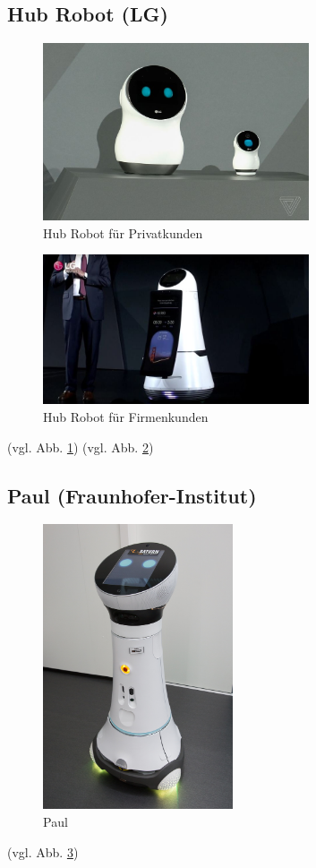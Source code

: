 \subsection{Hub Robot (LG)}
\begin{figure}
  \centering
     \includegraphics[width=0.7\textwidth]{hub_bot_privat}
  \caption{Hub Robot für Privatkunden}
  \label{fig:hub-bot-privat}
\end{figure}
\begin{figure} 
  \centering
     \includegraphics[width=0.7\textwidth]{hub_bot_firmen}
  \caption{Hub Robot für Firmenkunden}
  \label{fig:hub-bot-firma}
\end{figure}
(vgl. Abb. \ref{fig:hub-bot-privat}) (vgl. Abb. \ref{fig:hub-bot-firma})

\subsection{Paul (Fraunhofer-Institut)}
\begin{figure}
  \centering
     \includegraphics[width=0.5\textwidth]{paul}
  \caption{Paul}
  \label{fig:paul}
\end{figure}
(vgl. Abb. \ref{fig:paul})

